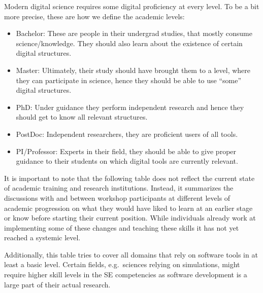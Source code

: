 \documentclass[a4paper
]{article}
\providecommand{\tightlist}{%
  \setlength{\itemsep}{0pt}\setlength{\parskip}{0pt}}
\begin{document}
Modern digital science requires some digital proficiency at every level.
To be a bit more precise, these are how we define the academic levels:

\begin{itemize}
\tightlist
\item
  Bachelor: These are people in their undergrad studies, that mostly
  consume science/knowledge. They should also learn about the existence
  of certain digital structures.
\item
  Master: Ultimately, their study should have brought them to a level,
  where they can participate in science, hence they should be able to
  use ``some'' digital structures.
\item
  PhD: Under guidance they perform independent research and hence they
  should get to know all relevant structures.
\item
  PostDoc: Independent researchers, they are proficient users of all
  tools.
\item
  PI/Professor: Experts in their field, they should be able to give
  proper guidance to their students on which digital tools are currently
  relevant.
\end{itemize}

It is important to note that the following table does not reflect the
current state of academic training and research institutions. Instead,
it summarizes the discussions with and between workshop participants at
different levels of academic progression on what they would have liked
to learn at an earlier stage or know before starting their current
position. While individuals already work at implementing some of these
changes and teaching these skills it has not yet reached a systemic
level.

Additionally, this table tries to cover all domains that rely on
software tools in at least a basic level. Certain fields, e.g.~sciences
relying on simulations, might require higher skill levels in the SE
competencies as software development is a large part of their actual
research.
\end{document}
